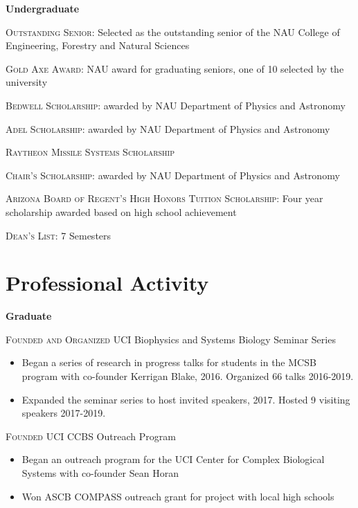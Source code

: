 \documentclass[letterpaper,10pt]{article} %
\begin{document}
{\large \textbf{Undergraduate}}

\begin{description}[itemsep=-1ex]
\item \textsc{Outstanding Senior}: Selected as the outstanding senior of the NAU College of Engineering, Forestry and Natural Sciences
\item \textsc{Gold Axe Award}: NAU award for graduating seniors, one of 10 selected by the university
\item \textsc{Bedwell Scholarship}: awarded by NAU Department of Physics and Astronomy 
\item \textsc{Adel Scholarship}: awarded by NAU Department of Physics and Astronomy 
\item \textsc{Raytheon Missile Systems Scholarship}
\item \textsc{Chair's Scholarship}: awarded by NAU Department of Physics and Astronomy  
\item \textsc{Arizona Board of Regent's High Honors Tuition Scholarship}: Four year scholarship awarded based on high school achievement
\item \textsc{Dean's List}: 7 Semesters
\end{description}


\bigskip
\section*{Professional Activity}
\bigskip

{\large \textbf{Graduate}}

\textsc{Founded and Organized} UCI Biophysics and Systems Biology Seminar Series
\begin{itemize}
\item Began a series of research in progress talks for students in the MCSB program with co-founder Kerrigan Blake, 2016. Organized 66 talks 2016-2019.
\item Expanded the seminar series to host invited speakers, 2017. Hosted 9 visiting speakers 2017-2019.
\end{itemize}

\textsc{Founded} UCI CCBS Outreach Program
\begin{itemize}
\item Began an outreach program for the UCI Center for Complex Biological Systems with co-founder Sean Horan
\item Won ASCB COMPASS outreach grant for project with local high schools
\end{itemize}
\end{document}
